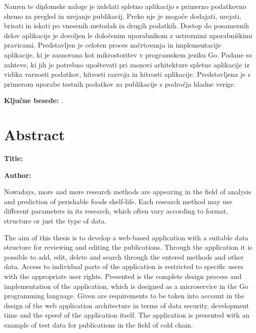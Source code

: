 Namen te diplomske naloge je izdelati spletno aplikacijo s primerno podatkovno shemo za pregled in urejanje publikacij. Preko nje je mogoče dodajati, urejati, brisati in iskati po vnesenih metodah in drugih podatkih. Dostop do posameznih delov aplikacije je dovoljen le določenim uporabnikom z ustreznimi uporabniškimi pravicami. Predstavljen je celoten proces načrtovanja in implementacije aplikacije, ki je zasnovana kot mikrostoritev v programskem jeziku Go. Podane so zahteve, ki jih je potrebno upoštevati pri zasnovi arhitekture spletne aplikacije iz vidika varnosti podatkov, hitrosti razvoja in hitrosti aplikacije. Predstavljena je s primerom uporabe testnih podatkov za publikacije s področja hladne verige.

\bigskip

\noindent\textbf{Ključne besede:} \tkeywords.
\clearemptydoublepage

\chapter*{Abstract}

\noindent\textbf{Title:} \ttitleEn
\bigskip

\noindent\textbf{Author:} \tauthor
\bigskip

\noindent Nowadays, more and more research methods are appearing in the field of analysis and prediction of perishable foods shelf-life. Each research method may use different parameters in its research, which often vary according to format, structure or just the type of data.

The aim of this thesis is to develop a web-based application with a suitable data structure for reviewing and editing the publications. Through the application it is possible to add, edit, delete and search through the entered methods and other data. Access to individual parts of the application is restricted to specific users with the appropriate user rights. Presented is the complete design process and implementation of the application, which is designed as a microservice in the Go programming language. Given are requirements to be taken into account in the design of the web application architecture in terms of data security, development time and the speed of the application itself. The application is presented with an example of test data for publications in the field of cold chain.
\bigskip

